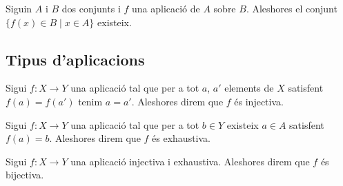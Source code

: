 \documentclass[../../Main.tex]{subfiles}
\begin{document}
	\begin{axiom}
		Siguin \(A\) i \(B\) dos conjunts i \(f\) una aplicació de \(A\) sobre \(B\). Aleshores el conjunt \(\{f(x)\in B\mid x\in A\}\) existeix.
	\end{axiom}
	\subsection{Tipus d'aplicacions}
	\begin{definition}
		\label{def:aplicació injectiva}
		Sigui \(f\colon X\longrightarrow Y\) una aplicació tal que per a tot \(a\), \(a'\) elements de \(X\) satisfent \(f(a)=f(a')\) tenim \(a=a'\). Aleshores direm que \(f\) és injectiva.
	\end{definition}
	\begin{definition}
		\label{def:aplicació exhaustiva}
		Sigui \(f\colon X\longrightarrow Y\) una aplicació tal que per a tot \(b\in Y\) existeix \(a\in A\) satisfent \(f(a)=b\). Aleshores direm que \(f\) és exhaustiva.
	\end{definition}
	\begin{definition}
		\label{def:aplicació bijectiva}
		Sigui \(f\colon X\longrightarrow Y\) una aplicació injectiva i exhaustiva. Aleshores direm que \(f\) és bijectiva.
	\end{definition}
\end{document}
